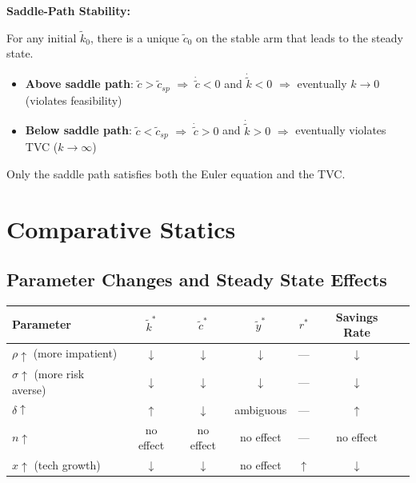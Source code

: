 \documentclass[a4paper,11pt]{article}
\newcommand{\ktilde}{\tilde{k}}
\newcommand{\ytilde}{\tilde{y}}
\newcommand{\ctilde}{\tilde{c}}
\begin{document}
\begin{resultbox}
\textbf{Saddle-Path Stability:}

For any initial $\ktilde_0$, there is a unique $\ctilde_0$ on the stable arm that leads to the steady state.

\begin{itemize}
    \item \textbf{Above saddle path}: $\ctilde > \ctilde_{sp}$ $\Rightarrow$ $\dot{\ctilde} < 0$ and $\dot{\ktilde} < 0$ $\Rightarrow$ eventually $k \to 0$ (violates feasibility)
    \item \textbf{Below saddle path}: $\ctilde < \ctilde_{sp}$ $\Rightarrow$ $\dot{\ctilde} > 0$ and $\dot{\ktilde} > 0$ $\Rightarrow$ eventually violates TVC ($k \to \infty$)
\end{itemize}
\end{resultbox}

Only the saddle path satisfies both the Euler equation and the TVC.

\section{Comparative Statics}

\subsection*{Parameter Changes and Steady State Effects}

\begin{center}
\begin{tabular}{lcccccc}
\toprule
Parameter & $\ktilde^*$ & $\ctilde^*$ & $\ytilde^*$ & $r^*$ & Savings Rate \\
\midrule
$\rho \uparrow$ (more impatient) & $\downarrow$ & $\downarrow$ & $\downarrow$ & — & $\downarrow$ \\
$\sigma \uparrow$ (more risk averse) & $\downarrow$ & $\downarrow$ & $\downarrow$ & — & $\downarrow$ \\
$\delta \uparrow$ & $\uparrow$ & $\downarrow$ & ambiguous & — & $\uparrow$ \\
$n \uparrow$ & no effect & no effect & no effect & — & no effect \\
$x \uparrow$ (tech growth) & $\downarrow$ & $\downarrow$ & no effect & $\uparrow$ & $\downarrow$ \\
\bottomrule
\end{tabular}
\end{center}
\end{document}
